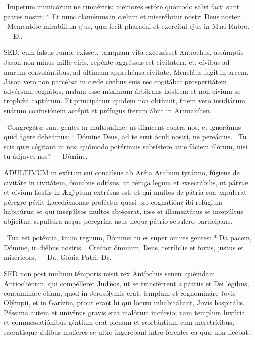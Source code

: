 \R\ Impetum inimicórum ne timuéritis: mémores estóte quómodo salvi facti sunt patres nostri: * Et nunc clamémus in cælum et miserébitur nostri Deus noster. \V\ Mementóte mirabílium ejus, quæ fecit pharaóni et exercítui ejus in Mari Rubro. — Et.


\lettrine[lines=2]{S}{ED}, cum falsus rumor exísset, tamquam vita excessísset Antíochus, assúmptis Jason non minus mille viris, repénte aggréssus est civitátem, et, cívibus ad murum convolántibus, ad últimum apprehénsa civitáte, Meneláus fugit in arcem. Jason vero non parcébat in cæde cívibus suis nec cogitábat prosperitátem advérsum cognátos, malum esse máximum árbitrans hóstium et non cívium se trophǽa captúrum. Et principátum quidem non obtínuit, finem vero insidiárum suárum confusiónem accépit et prófugus íterum ábiit in Ammaníten.

\R\ Congregátæ sunt gentes in multitúdine, ut dímicent contra nos, et ignorámus quid ágere debeámus: * Dómine Deus, ad te sunt óculi nostri, ne pereámus. \V\ Tu scis quæ cógitant in nos: quómodo potérimus subsístere ante fáciem illórum, nisi tu ádjuves nos? — Dómine.



\lettrine[lines=2]{A}{DULTIMUM} in exítium sui conclúsus ab Aréta Arabum tyránno, fúgiens de civitáte in civitátem, ómnibus odiósus, ut réfuga legum et exsecrábilis, ut pátriæ et cívium hostis in Ægýptum extrúsus est; et qui multos de pátria sua expúlerat péregre périit Lacedǽmonas proféctus quasi pro cognatióne ibi refúgium habitúrus; et qui insepúltos multos abjécerat, ipse et illamentátus et insepúltus abjícitur, sepultúra neque peregrína usus neque pátrio sepúlcro partícipans.

\R\ Tua est poténtia, tuum regnum, Dómine: tu es super omnes gentes: * Da pacem, Dómine, in diébus nostris. \V\ Creátor ómnium, Deus, terríbilis et fortis, justus et miséricors. — Da. Glória Patri. Da.




\lettrine[lines=2]{S}{ED} non post multum témporis misit rex Antíochus senem quémdam Antiochénum, qui compélleret Judǽos, ut se transférrent a pátriis et Dei légibus, contamináre étiam, quod in Jerosólymis erat, templum et cognomináre Jovis Olýmpii, et in Garízim, prout erant hi qui locum inhabitábant, Jovis hospitális. Péssima autem et univérsis gravis erat malórum incúrsio; nam templum luxúria et commessatiónibus géntium erat plenum et scortántium cum meretrícibus, sacratísque ǽdibus mulíeres se ultro ingerébant intro ferentes ea quæ non licébat.

